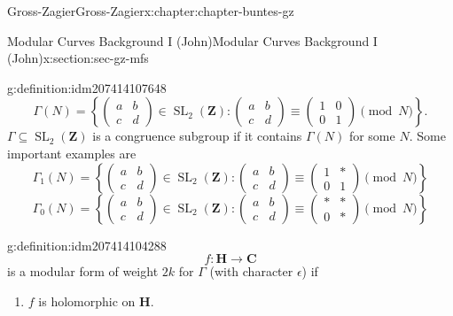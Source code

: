 \documentclass[oneside,10pt,]{book}
\numberwithin{equation}{section}
\newcommand{\ZZ}{\mathbf{Z}}
\newcommand{\CC}{\mathbf{C}}
\newcommand{\HH}{\mathbf{H}}
\DeclareMathOperator{\SL}{SL}
\newcommand{\amp}{&}
\begin{document}
\begin{chapterptx}{Gross-Zagier}{}{Gross-Zagier}{}{}{x:chapter:chapter-buntes-gz}
\begin{sectionptx}{Modular Curves Background I (John)}{}{Modular Curves Background I (John)}{}{}{x:section:sec-gz-mfs}
\begin{definition}{}{g:definition:idm207414107648}
\begin{equation*}
\Gamma (N) = \left\{\begin{pmatrix} a \amp b \\ c \amp d \end{pmatrix}\in \SL_2(\ZZ) : \begin{pmatrix} a \amp b \\ c \amp d \end{pmatrix} \equiv \begin{pmatrix} 1 \amp 0 \\ 0 \amp 1 \end{pmatrix} \pmod N\right\}\text{.}
\end{equation*}
\(\Gamma\subseteq \SL_2(\ZZ)\) is a  congruence subgroup if it contains \(\Gamma (N)\) for some \(N\). Some important examples are%
\begin{equation*}
\Gamma_1 (N) = \left\{\begin{pmatrix} a \amp b \\ c \amp d \end{pmatrix}\in \SL_2(\ZZ) : \begin{pmatrix} a \amp b \\ c \amp d \end{pmatrix} \equiv \begin{pmatrix} 1 \amp \ast \\ 0 \amp 1 \end{pmatrix} \pmod N\right\}
\end{equation*}
%
\begin{equation*}
\Gamma_0 (N) = \left\{\begin{pmatrix} a \amp b \\ c \amp d \end{pmatrix}\in \SL_2(\ZZ) : \begin{pmatrix} a \amp b \\ c \amp d \end{pmatrix} \equiv \begin{pmatrix} \ast \amp \ast \\ 0 \amp \ast \end{pmatrix} \pmod N\right\}
\end{equation*}
%
\end{definition}
\begin{definition}{}{g:definition:idm207414104288}%
%
\begin{equation*}
f\colon \HH \to \CC
\end{equation*}
is a modular form of weight \(2k\) for \(\Gamma \) (with character \(\epsilon \)) if%
\begin{enumerate}
\item{}\(f\) is holomorphic on \(\HH\).%

\end{enumerate}
\end{definition}
\end{sectionptx}
\end{chapterptx}
\end{document}
